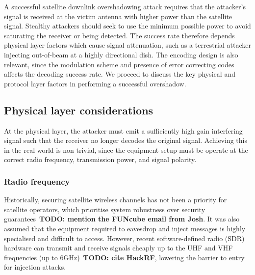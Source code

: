 A successful satellite downlink overshadowing attack requires that the attacker's signal is received at the victim antenna with higher power than the satellite signal.
Stealthy attackers should seek to use the minimum possible power to avoid saturating the receiver or being detected.
The success rate therefore depends physical layer factors which cause signal attenuation, such as a terrestrial attacker injecting out-of-beam at a highly directional dish.
The encoding design is also relevant, since the modulation scheme and presence of error correcting codes affects the decoding success rate.
We proceed to discuss the key physical and protocol layer factors in performing a successful overshadow.





\subsection{Physical layer considerations}

At the physical layer, the attacker must emit a sufficiently high gain interfering signal such that the receiver no longer decodes the original signal.
Achieving this in the real world is non-trivial, since the equipment setup must be operate at the correct radio frequency, transmission power, and signal polarity.

\subsubsection{Radio frequency}

Historically, securing satellite wireless channels has not been a priority for satellite operators, which prioritise system robustness over security guarantees~\textbf{TODO: mention the FUNcube email from Josh}.
It was also assumed that the equipment required to eavesdrop and inject messages is highly specialised and difficult to access.
However, recent software-defined radio (SDR) hardware can transmit and receive signals cheaply up to the UHF and VHF frequencies (up to 6GHz)~\textbf{TODO: cite HackRF}, lowering the barrier to entry for injection attacks.

